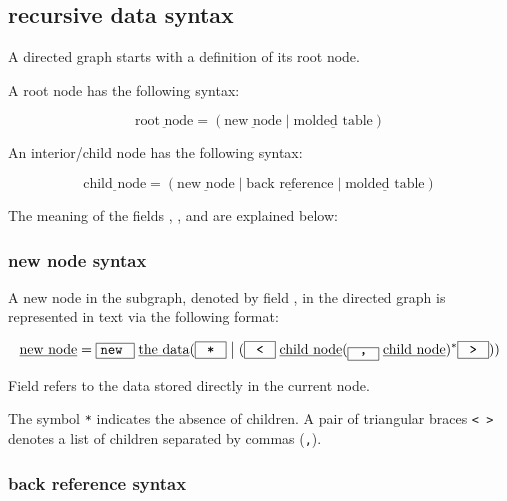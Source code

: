 \documentclass{article}
\newcommand{\literal}[1]{\fbox{\texttt{#1}}}
\newcommand{\sor}{\;\big|\;}
\begin{document}
\subsection{recursive data syntax}

A directed graph starts with a definition of its root node.

A root node has the following syntax: 

\[\underline{\text{root node}} = (\underline{\text{new node}} \sor \underline{\text{molded table}})\]

\vspace{5mm}

An interior/child node has the following syntax: 

\[\underline{\text{child node}} = (\underline{\text{new node}} \sor \underline{\text{back reference}} \sor \underline{\text{molded table}})\]

The meaning of the fields \underline{}, \underline{}, and \underline{} are explained below:

\vspace{5mm}

\subsubsection{new node syntax}

A new node in the subgraph, denoted by field \underline{}, in the directed graph is represented in text via the following format:

\[\underline{\text{new node}} = \literal{new }\;\underline{\text{the data}}(\literal{ * } \sor (\literal{ < }\;\underline{\text{child node}}(\literal{ , }\;\underline{\text{child node}})^*\literal{ > }))\]

Field \underline{} refers to the data stored directly in the current node. 

The symbol \texttt{*} indicates the absence of children. A pair of triangular braces \texttt{< >} denotes a list of children separated by commas (\texttt{,}). 

\subsubsection{back reference syntax}
\end{document}
